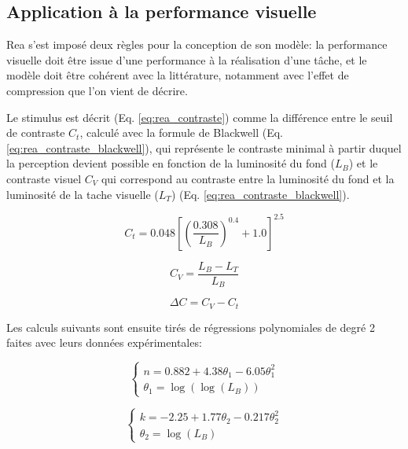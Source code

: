 	\subsection{Application à la performance visuelle}
	\par Rea s'est imposé deux règles pour la conception de son modèle: la performance visuelle doit être issue d'une performance à la réalisation d'une tâche, et le modèle doit être cohérent avec la littérature, notamment avec l'effet de compression que l'on vient de décrire.
	
	\par Le stimulus est décrit (Eq. \ref{eq:rea_contraste}) comme la différence entre le seuil de contraste $C_t$, calculé avec la formule de Blackwell (Eq. \ref{eq:rea_contraste_blackwell}), qui représente le contraste minimal à partir duquel la perception devient possible en fonction de la luminosité du fond ($L_B$) et le contraste visuel $C_V$ qui correspond au contraste entre la luminosité du fond et la luminosité de la tache visuelle ($L_T$) (Eq. \ref{eq:rea_contraste_blackwell}).
	
	\begin{equation}
		C_t = 0.048\left[\left(\frac{0.308}{L_B}\right)^{0.4} + 1.0\right]^{2.5}
		\label{eq:rea_contraste_blackwell}
	\end{equation}
	
	\begin{equation}
		C_V = \frac{L_B - L_T}{L_B}
		\label{eq:rea_contraste_visuel}
	\end{equation}
	
	\begin{equation}
		\Delta C = C_V - C_t
		\label{eq:rea_contraste}
	\end{equation}
	
	\par Les calculs suivants sont ensuite tirés de régressions polynomiales de degré 2 faites avec leurs données expérimentales:
	
	\begin{equation}
		\begin{cases}
		n =  0.882 + 4.38 \theta_1 - 6.05 \theta_1^2\\
		\theta_1 = \log(\log(L_B))
		\end{cases} 
		\label{eq:rea_n}
	\end{equation}
	
	\begin{equation}
		\begin{cases}
		k =  -2.25 + 1.77 \theta_2 - 0.217 \theta_2^2\\
		\theta_2 = \log(L_B)
		\end{cases} 
		\label{eq:rea_k}
	\end{equation}
	
